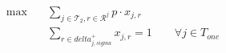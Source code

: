 \begin{align}
  \max\quad & \sum_{j \in \mathcal{T}_{2}, r \in \mathcal{R}^{j}} p \cdot x_{j,r} \tag{eq\_0006} \\
  & \sum_{r \in \mathit{delta}_{j,\mathit{sigma}}^{+}} x_{j,r} = 1 \qquad \forall j \in T_{\mathit{one}} \tag{eq\_0008} \\
\end{align}

